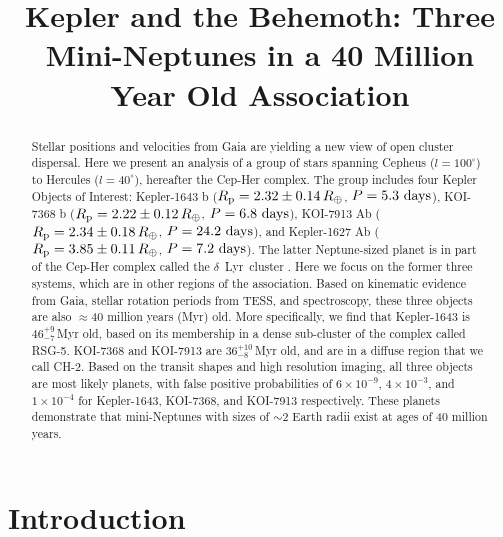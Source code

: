 \documentclass[12pt,twocolumn]{aastex63}
\begin{document}
\title{
  Kepler and the Behemoth: Three Mini-Neptunes in a 40 Million Year Old Association
}



\begin{abstract}
  Stellar positions and velocities from Gaia are yielding a new view
  of open cluster dispersal.  
  Here we present an analysis of a group
  of stars spanning Cepheus ($l=100^\circ$) to Hercules ($l=40^\circ$),
  hereafter the Cep-Her complex.  The group includes four Kepler
  Objects of Interest:
  Kepler-1643 b ($R_{\rm p} = 2.32 \pm 0.14\,R_\oplus$, $P = 5.3\ {\rm days}$),
  KOI-7368 b ($R_{\rm p} = 2.22 \pm 0.12\,R_\oplus$, $P = 6.8\ {\rm days}$), 
  KOI-7913 Ab ($R_{\rm p} = 2.34 \pm 0.18\,R_\oplus$, $P = 24.2\ {\rm days}$), and
  Kepler-1627 Ab ($R_{\rm p} = 3.85 \pm 0.11\,R_\oplus$, $P = 7.2\ {\rm days}$).
  The latter Neptune-sized planet is in part of the Cep-Her complex
  called the $\delta$\ Lyr\ cluster \citep{bouma_kep1627_2022}.  Here
  we focus on the former three systems, which are in other regions of
  the association.  Based on kinematic evidence from Gaia, stellar
  rotation periods from TESS, and spectroscopy, these three objects
  are also $\approx$40 million years (Myr) old.  More specifically, we
  find that Kepler-1643 is $46^{+9}_{-7}$\,Myr old, based on its
  membership in a dense sub-cluster of the complex called RSG-5.
  KOI-7368 and KOI-7913 are $36^{+10}_{-8}$\,Myr old, and are in a
  diffuse region that we call CH-2.  Based on the transit shapes and
  high resolution imaging, all three objects are most likely planets,
  with false positive probabilities of $6\times10^{-9}$,
  $4\times10^{-3}$, and $1\times10^{-4}$ for Kepler-1643, KOI-7368,
  and KOI-7913 respectively.  These planets demonstrate
  that mini-Neptunes with sizes of $\sim$2 Earth radii exist at ages
  of 40 million years.
\end{abstract}



\section{Introduction}
\end{document}

